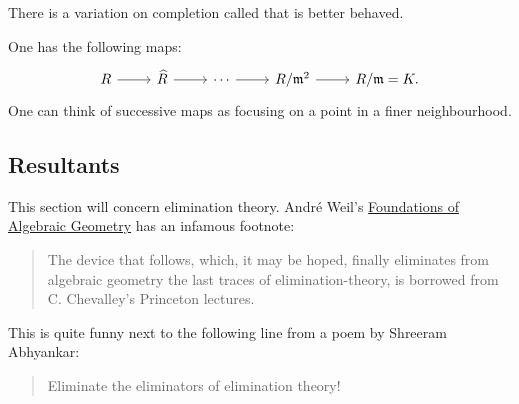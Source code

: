 \documentclass [11 pt, oneside] {article}
\begin{document}
\begin{remark}
	There is a variation on completion called  that is better behaved.
\end{remark}

One has the following maps:
\[
\begin{tikzcd}
	R\ar[r]&\widehat{R}\ar[r] &\cdots\ar[r] & R/\mathfrak{m}^2 \ar[r]& R/\mathfrak{m} = K.
\end{tikzcd}
\]
One can think of successive maps as focusing on a point in a finer neighbourhood.


\subsection{Resultants}
This section will concern elimination theory. Andr\'e Weil's \ul{Foundations of Algebraic Geometry} has an infamous footnote:
\begin{quote}
	\small 
	The device that follows, which, it may be hoped, finally eliminates from algebraic geometry the last traces of elimination-theory, is borrowed from C. Chevalley's Princeton lectures.
\end{quote}
This is quite funny next to the following line from a poem by Shreeram Abhyankar:
\begin{quote}
	\small 
	Eliminate the eliminators of elimination theory!
\end{quote}
\end{document}
